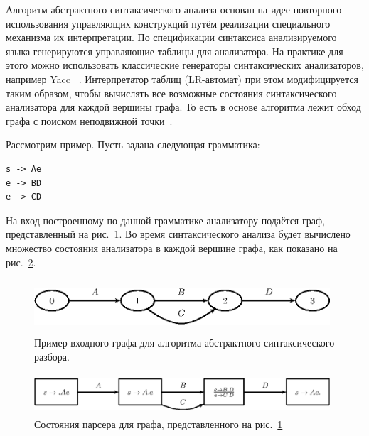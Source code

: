 \documentclass[a5paper]{article}
\begin{document}
Алгоритм абстрактного синтаксического анализа основан на идее повторного использования управляющих конструкций путём реализации специального механизма их интерпретации. По спецификации синтаксиса анализируемого языка генерируются управляющие таблицы для анализатора. На практике для этого можно использовать классические генераторы синтаксических анализаторов, например Yacc ~\cite{Yacc}. Интерпретатор таблиц (LR-автомат) при этом модифицируется таким образом, чтобы вычислять все возможные состояния синтаксического анализатора для каждой вершины графа. То есть в основе алгоритма лежит обход графа с поиском неподвижной точки~\cite{ALVOR2}.

Рассмотрим пример. Пусть задана следующая грамматика:

\begin{verbatim}
s -> Ae
e -> BD
e -> CD
\end{verbatim}

На вход построенному по данной грамматике анализатору подаётся граф, представленный на рис.~\ref{pic2}. Во время синтаксического анализа будет вычислено множество состояния анализатора в каждой вершине графа, как показано на рис.~\ref{pic3}.

\begin{figure}
    \begin{center}
        \includegraphics[width=11cm,height=2cm]{graphs/simple_grammar_inpt.eps}
        \caption{Пример входного графа для алгоритма абстрактного синтаксического разбора.}
        \label{pic2}
    \end{center}
\end{figure}

\begin{figure}
    \begin{center}
        \includegraphics[width=11cm,height=1.5cm]{graphs/simple_grammar_items.eps}
        \caption{Состояния парсера для графа, представленного на рис.~\ref{pic2}}
        \label{pic3}
    \end{center}
\end{figure}
\end{document}
